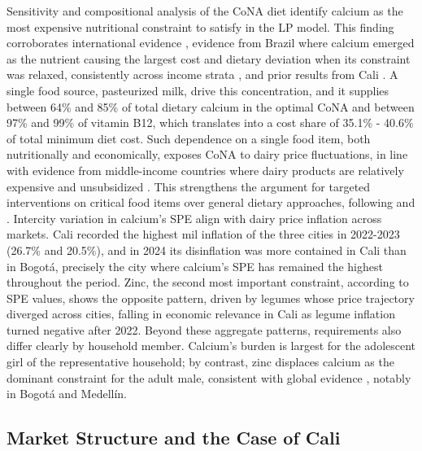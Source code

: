 \documentclass[Afour, sageh,times]{sagej}
\begin{document}
\smallskip

Sensitivity and compositional analysis of the CoNA diet identify calcium as the most expensive nutritional constraint to satisfy in the LP model. This finding corroborates international evidence \cite{Bai2022b}, evidence from Brazil where calcium emerged as the nutrient causing the largest cost and dietary deviation when its constraint was relaxed, consistently across income strata \cite{Verly2020}, and prior results from Cali \cite{Yoshioka2026}.  A single food source, pasteurized milk, drive this concentration, and it supplies between 64\% and 85\% of total dietary calcium in the optimal CoNA and between 97\% and 99\% of vitamin B12, which translates into a cost share of 35.1\% - 40.6\% of total minimum diet cost. Such dependence on a single food item, both nutritionally and economically, exposes CoNA to dairy price fluctuations, in line with evidence from middle-income countries where dairy products are relatively expensive and unsubsidized \cite{Bai2022b, Raghunathan2020}. This strengthens the argument for targeted interventions on critical food items over general dietary approaches, following \citet{Wallingford2024} and \citet{Ryckman2021}. Intercity variation in calcium's SPE align with dairy price inflation across markets. Cali recorded the highest mil inflation of the three cities in 2022-2023 (26.7\% and 20.5\%),  and in 2024 its disinflation was more contained in Cali than in Bogotá, precisely the city where calcium's SPE has remained the highest throughout the period. Zinc, the second most important constraint, according to SPE values, shows the opposite pattern, driven by legumes whose price trajectory diverged across cities, falling in economic relevance in Cali as legume inflation turned negative after 2022. Beyond these aggregate patterns, requirements also differ clearly by household member. Calcium's burden is largest for the adolescent girl of the representative household; by contrast, zinc displaces calcium as the dominant constraint for the adult male, consistent with global evidence \citep{Bai2022b}, notably in Bogotá and Medellín.

\subsection{Market Structure and the Case of Cali}
\end{document}
